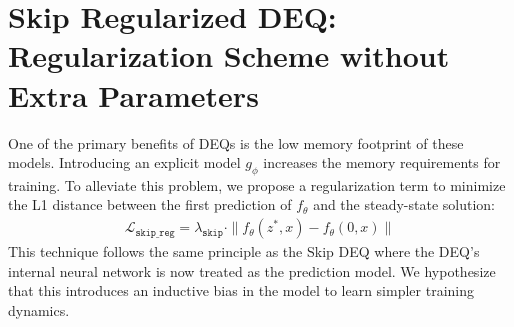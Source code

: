 \section{Skip Regularized DEQ: Regularization Scheme without Extra Parameters}
\label{sec:skip_reg_deq}

One of the primary benefits of DEQs is the low memory footprint of these models. Introducing an explicit model $g_\phi$ increases the memory requirements for training. To alleviate this problem, we propose a regularization term to minimize the L1 distance between the first prediction of $f_\theta$ and the steady-state solution:
%
\begin{align}
    \mathcal{L}_{\texttt{skip\_reg}} = \lambda_{\texttt{skip}} \cdot \| f_\theta(z^*, x) - f_\theta(0, x) \|
\end{align}
%
This technique follows the same principle as the Skip DEQ where the DEQ's internal neural network is now treated as the prediction model. We hypothesize that this introduces an inductive bias in the model to learn simpler training dynamics.
